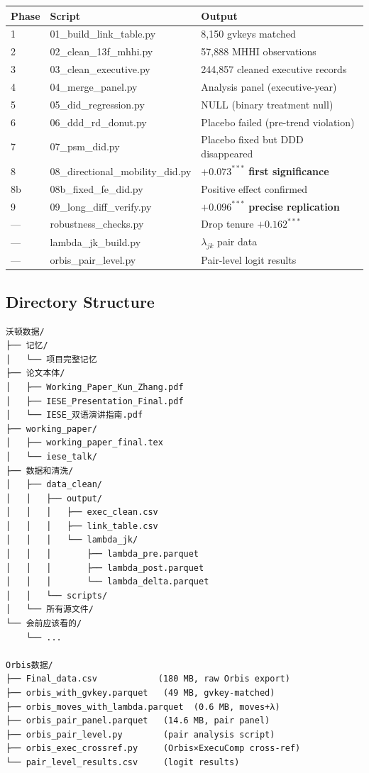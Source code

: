 \documentclass[11pt,a4paper]{article}
\begin{document}
\begin{longtable}{p{3cm}p{3cm}p{5.5cm}}
\toprule
\textbf{Phase} & \textbf{Script} & \textbf{Output} \\
\midrule
1 & 01\_build\_link\_table.py & 8,150 gvkeys matched \\
2 & 02\_clean\_13f\_mhhi.py & 57,888 MHHI observations \\
3 & 03\_clean\_executive.py & 244,857 cleaned executive records \\
4 & 04\_merge\_panel.py & Analysis panel (executive-year) \\
5 & 05\_did\_regression.py & NULL (binary treatment null) \\
6 & 06\_ddd\_rd\_donut.py & Placebo failed (pre-trend violation) \\
7 & 07\_psm\_did.py & Placebo fixed but DDD disappeared \\
8 & 08\_directional\_mobility\_did.py & {\bf \(+0.073^{***}\) first significance} \\
8b & 08b\_fixed\_fe\_did.py & Positive effect confirmed \\
9 & 09\_long\_diff\_verify.py & {\bf \(+0.096^{***}\) precise replication} \\
— & robustness\_checks.py & Drop tenure \(+0.162^{***}\) \\
— & lambda\_jk\_build.py & \(\lambda_{jk}\) pair data \\
— & orbis\_pair\_level.py & Pair-level logit results \\
\bottomrule
\end{longtable}

\newpage

\subsection{Directory Structure}

\begin{verbatim}
沃顿数据/
├── 记忆/
│   └── 项目完整记忆
├── 论文本体/
│   ├── Working_Paper_Kun_Zhang.pdf
│   ├── IESE_Presentation_Final.pdf
│   └── IESE_双语演讲指南.pdf
├── working_paper/
│   ├── working_paper_final.tex
│   └── iese_talk/
├── 数据和清洗/
│   ├── data_clean/
│   │   ├── output/
│   │   │   ├── exec_clean.csv
│   │   │   ├── link_table.csv
│   │   │   └── lambda_jk/
│   │   │       ├── lambda_pre.parquet
│   │   │       ├── lambda_post.parquet
│   │   │       └── lambda_delta.parquet
│   │   └── scripts/
│   └── 所有源文件/
└── 会前应该看的/
    └── ...

Orbis数据/
├── Final_data.csv            (180 MB, raw Orbis export)
├── orbis_with_gvkey.parquet   (49 MB, gvkey-matched)
├── orbis_moves_with_lambda.parquet  (0.6 MB, moves+λ)
├── orbis_pair_panel.parquet   (14.6 MB, pair panel)
├── orbis_pair_level.py        (pair analysis script)
├── orbis_exec_crossref.py     (Orbis×ExecuComp cross-ref)
└── pair_level_results.csv     (logit results)
\end{verbatim}
\end{document}
